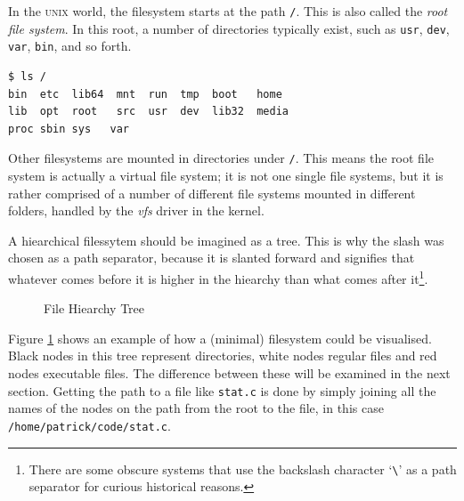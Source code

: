 \documentclass[a4paper]{article}
\begin{document}
In the \textsc{unix} world, the filesystem starts at the path \verb|/|. This is also called the \emph{root file system}. In this root, a number of directories typically exist, such as \verb|usr|, \verb|dev|, \verb|var|, \verb|bin|, and so forth.

\begin{verbatim}
$ ls /
bin  etc  lib64  mnt  run  tmp  boot   home 
lib  opt  root   src  usr  dev  lib32  media 
proc sbin sys   var
\end{verbatim}
Other filesystems are mounted in directories under \verb|/|. This means the root file system is actually a virtual file system; it is not one single file systems, but it is rather comprised of a number of different file systems mounted in different folders, handled by the \emph{vfs} driver in the kernel.

A hiearchical filessytem should be imagined as a tree. This is why the slash was chosen as a path separator, because it is slanted forward and signifies that whatever comes before it is higher in the hiearchy than what comes after it\footnote{There are some obscure systems that use the backslash character ‘\texttt{\textbackslash}’ as a path separator for curious historical reasons.}.
\begin{figure}[!h]
\centering
{}
\caption{File Hiearchy Tree}\label{fig:fstree}
\end{figure}
Figure \ref{fig:fstree} shows an example of how a (minimal) filesystem could be visualised. Black nodes in this tree represent directories, white nodes regular files and red nodes executable files. The difference between these will be examined in the next section. Getting the path to a file like \verb|stat.c| is done by simply joining all the names of the nodes on the path from the root to the file, in this case \verb|/home/patrick/code/stat.c|.
\end{document}
